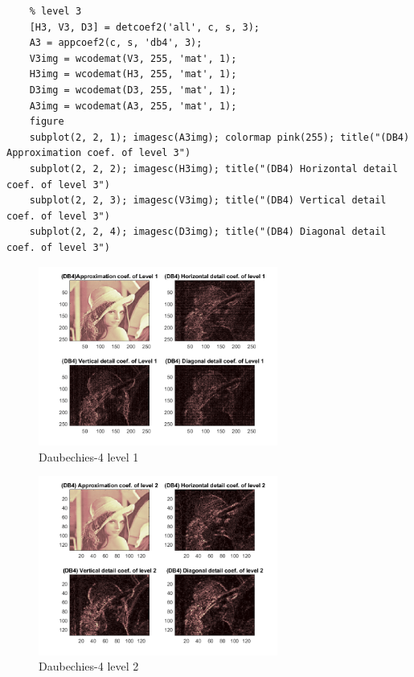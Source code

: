 \documentclass[12pt]{article}
\begin{document}
\begin{enumerate}[1]
\begin{enumerate}
\begin{lstlisting}
    % level 3
    [H3, V3, D3] = detcoef2('all', c, s, 3);
    A3 = appcoef2(c, s, 'db4', 3);
    V3img = wcodemat(V3, 255, 'mat', 1);
    H3img = wcodemat(H3, 255, 'mat', 1);
    D3img = wcodemat(D3, 255, 'mat', 1);
    A3img = wcodemat(A3, 255, 'mat', 1);
    figure
    subplot(2, 2, 1); imagesc(A3img); colormap pink(255); title("(DB4) Approximation coef. of level 3")
    subplot(2, 2, 2); imagesc(H3img); title("(DB4) Horizontal detail coef. of level 3")
    subplot(2, 2, 3); imagesc(V3img); title("(DB4) Vertical detail coef. of level 3")
    subplot(2, 2, 4); imagesc(D3img); title("(DB4) Diagonal detail coef. of level 3")   
\end{lstlisting}
    
    \begin{figure}[H]
        \centering
        \includegraphics[width=0.7\textwidth,height=0.7\textwidth]{Figures/DB_1.png}
        \caption{Daubechies-4 level 1}
        \label{Q4_b_level1}
    \end{figure}
    \begin{figure}[H]
        \centering
        \includegraphics[width=0.7\textwidth,height=0.7\textwidth]{Figures/DB_2.png}
        \caption{Daubechies-4 level 2}
        \label{Q4_b_level2}
    \end{figure}


\end{enumerate}
\end{enumerate}
\end{document}

